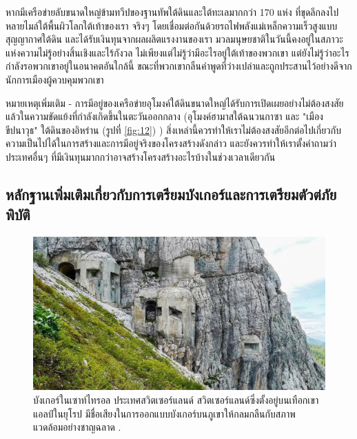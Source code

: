 \documentclass[10pt,twocolumn,letterpaper]{article}
\begin{document}
หากมีเครือข่ายลับขนาดใหญ่ข้ามทวีปของฐานทัพใต้ดินและใต้ทะเลมากกว่า 170 แห่ง ที่ขุดลึกลงไปหลายไมล์ใต้พื้นผิวโลกใต้เท้าของเรา จริงๆ โดยเชื่อมต่อกันด้วยรถไฟพลังแม่เหล็กความเร็วสูงแบบสุญญากาศใต้ดิน และได้รับเงินทุนจากผลผลิตแรงงานของเรา มวลมนุษยชาติในวันนี้คงอยู่ในสภาวะแห่งความไม่รู้อย่างสิ้นเชิงและไร้กังวล ไม่เพียงแต่ไม่รู้ว่ามีอะไรอยู่ใต้เท้าของพวกเขา แต่ยังไม่รู้ว่าอะไรกำลังรอพวกเขาอยู่ในอนาคตอันใกล้นี้ ขณะที่พวกเขากลืนคำพูดที่ว่างเปล่าและถูกประสานไว้อย่างดีจากนักการเมืองผู้ควบคุมพวกเขา

หมายเหตุเพิ่มเติม - การมีอยู่ของเครือข่ายอุโมงค์ใต้ดินขนาดใหญ่ได้รับการเปิดเผยอย่างไม่ต้องสงสัยแล้วในความขัดแย้งที่กำลังเกิดขึ้นในตะวันออกกลาง (อุโมงค์ฮามาสใต้ฉนวนกาซา \cite{38} และ "เมืองขีปนาวุธ" ใต้ดินของอิหร่าน (รูปที่ \ref{fig:12}) \cite{39,40}) สิ่งเหล่านี้ควรทำให้เราไม่ต้องสงสัยอีกต่อไปเกี่ยวกับความเป็นไปได้ในการสร้างและการมีอยู่จริงของโครงสร้างดังกล่าว และยังควรทำให้เราตั้งคำถามว่า ประเทศอื่นๆ ที่มีเงินทุนมากกว่าอาจสร้างโครงสร้างอะไรบ้างในช่วงเวลาเดียวกัน
\subsection{หลักฐานเพิ่มเติมเกี่ยวกับการเตรียมบังเกอร์และการเตรียมตัวต่ภัยพิบัติ}

\begin{figure}[t]
\begin{center}
   \includegraphics[width=1\linewidth]{tyrol.jpg}
\end{center}
   \caption{บังเกอร์ในเซาท์ไทรอล  ประเทศสวิตเซอร์แลนด์ สวิตเซอร์แลนด์ซึ่งตั้งอยู่บนเทือกเขาแอลป์ในยุโรป มีชื่อเสียงในการออกแบบบังเกอร์บนภูเขาให้กลมกลืนกับสภาพแวดล้อมอย่างชาญฉลาด \cite{32}.}
\label{fig:7}
\label{fig:onecol}
\end{figure}
\end{document}
